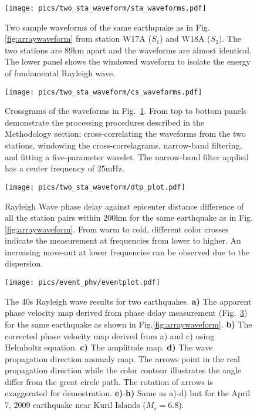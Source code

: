 \documentclass[referee]{gji}
\begin{document}
\begin{figure}
	\texttt{[image: pics/two\_sta\_waveform/sta\_waveforms.pdf]}
	\caption{Two sample waveforms of the same earthquake as in Fig.\ref{fig:arraywaveform} from station W17A ($S_1$) and W18A ($S_2$). The two stations are 89km apart and the waveforms are almost identical. The lower panel shows the windowed waveform to isolate the energy of fundamental Rayleigh wave.}
	\label{fig:twostawaveform}
\end{figure}

\begin{figure}
	\texttt{[image: pics/two\_sta\_waveform/cs\_waveforms.pdf]}
	\caption{Crossgrams of the waveforms in Fig.~\ref{fig:twostawaveform}. From top to bottom panels demonstrate the processing procedures described in the Methodology section: cross-correlating the waveforms from the two stations, windowing the cross-correlagrams, narrow-band filtering, and fitting a five-parameter wavelet. The narrow-band filter applied has a center frequency of 25mHz.}
	\label{fig:cswaveform}
\end{figure}

\begin{figure}
	\texttt{[image: pics/two\_sta\_waveform/dtp\_plot.pdf]}
	\caption{Rayleigh Wave phase delay against epicenter distance difference of all the station pairs within 200km for the same earthquake as in Fig.\ref{fig:arraywaveform}. From warm to cold, different color crosses indicate the measurement at frequencies from lower to higher. An increasing move-out at lower frequencies can be observed due to the dispersion. }
	\label{fig:dtp}
\end{figure}

\begin{figure}
	\texttt{[image: pics/event\_phv/eventplot.pdf]}
	\caption{The 40s Rayleigh wave results for two earthquakes. \textbf{a)} The apparent phase velocity map derived from phase delay measurement (Fig.~\ref{fig:dtp}) for the same earthquake as shown in Fig.\ref{fig:arraywaveform}. \textbf{b)} The corrected phase velocity map derived from a) and c) using Helmholtz equation. \textbf{c)} The amplitude map. \textbf{d)} The wave propagation direction anomaly map. The arrows point in the real propagation direction while the color contour illustrates the angle differ from the great circle path. The rotation of arrows is exaggerated for demostration. \textbf{e)}-\textbf{h)} Same as a)-d) but for the April 7, 2009 earthquake near Kuril Islands ($M_s=6.8$).}
	\label{fig:eventfig}
\end{figure}
\end{document}

